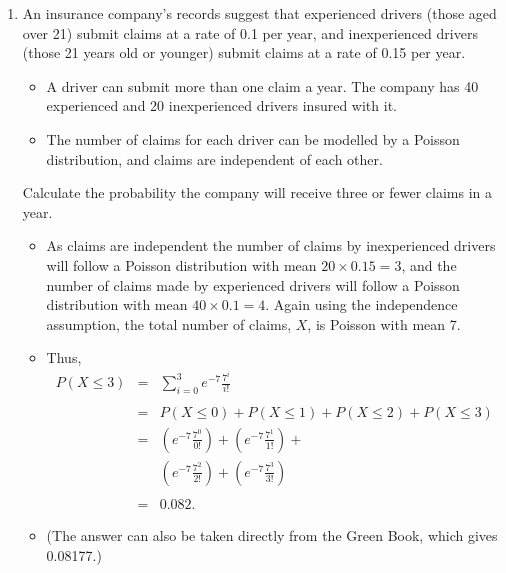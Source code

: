 \documentclass[a4paper,12pt]{article}
\begin{document}
\begin{enumerate}
\item  An insurance company’s records suggest that experienced drivers (those aged
over 21) submit claims at a rate of 0.1 per year, and inexperienced drivers (those 21 years old or younger) submit claims at a rate of 0.15 per year. 
\begin{itemize}
\item A driver can submit more than one claim a year. The company has 40 experienced and 20 inexperienced drivers insured with it.
\item The number of claims for each driver can be modelled by a Poisson distribution, and claims are independent of each other.
\end{itemize}
 Calculate the
probability the company will receive three or fewer claims in a year. 


\begin{itemize}
\item  As claims are independent the number of claims by inexperienced drivers will
follow a Poisson distribution with mean $20 \times 0.15 = 3$, and the number of claims
made by experienced drivers will follow a Poisson distribution with mean
$40 \times 0.1 = 4$. Again using the independence assumption, the total number of
claims, $X$, is Poisson with mean 7.
\item Thus, 
\begin{eqnarray*}
P(X \leq 3) &=& \sum^{3}_{i=0} e^{-7} \frac{7^i}{i!}\\
& & \\
&=& P(X \leq 0) + P(X \leq 1) + P(X \leq 2) + P(X \leq 3)\\
&=& \left(e^{-7} \frac{7^0}{0!} \right) + \left(e^{-7} \frac{7^1}{1!}\right) + \\
& & \left(e^{-7} \frac{7^2}{2!}\right) + \left(e^{-7} \frac{7^3}{3!}\right)\\
& & \\
&=& 0.082.
\end{eqnarray*}
\item (The answer can also be taken directly from the Green Book, which gives
0.08177.)
\end{itemize}

\newpage


\end{enumerate}
\end{document}
